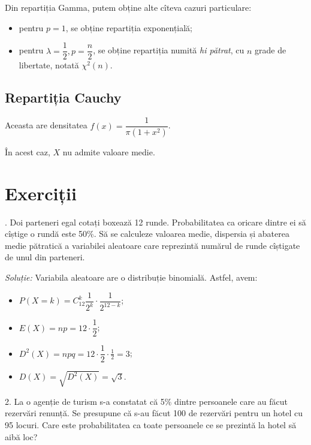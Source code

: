 \documentclass[12pt,a4paper]{article}
\theoremstyle{dotless}
\theoremstyle{dotlessdr}
\begin{document}
Din repartiția Gamma, putem obține alte cîteva cazuri particulare:
\begin{itemize}
\item pentru $ p = 1 $, se obține repartiția exponențială;
\item pentru $ \lambda = \dfrac{1}{2}, p = \dfrac{n}{2} $, se obține
  repartiția numită \emph{hi pătrat}, cu $ n $ grade de libertate,
  notată $ \chi^2(n) $.
\end{itemize}


\subsection*{Repartiția Cauchy}

\indent\indent Aceasta are densitatea $ f(x) = \dfrac{1}{\pi(1 + x^2)} $.

În acest caz, $ X $ nu admite valoare medie.


\section*{Exerciții}

\indent{}. Doi parteneri egal cotați boxează 12 runde. Probabilitatea
ca oricare dintre ei să cîștige o rundă este 50\%. Să se calculeze valoarea
medie, dispersia și abaterea medie pătratică a variabilei aleatoare care
reprezintă numărul de runde cîștigate de unul din parteneri.

\emph{Soluție:} Variabila aleatoare are o distribuție binomială.
Astfel, avem:
\begin{itemize}
\item $ P(X = k) = C_{12}^k \dfrac{1}{2^k} \cdot \dfrac{1}{2^{12-k}} $;
\item $ E(X) = np = 12 \cdot \dfrac{1}{2} $;
\item $ D^2(X) = npq = 12 \cdot \dfrac{1}{2} \cdot \frac{1}{2} = 3 $;
\item $ D(X) = \sqrt{D^2(X)} = \sqrt{3} $.
\end{itemize}

\vspace{1cm}

2. La o agenție de turism s-a constatat că 5\% dintre persoanele care au făcut
rezervări renunță. Se presupune că s-au făcut 100 de rezervări pentru un hotel cu
95 locuri. Care este probabilitatea ca toate persoanele ce se prezintă la hotel
să aibă loc?
\end{document}
